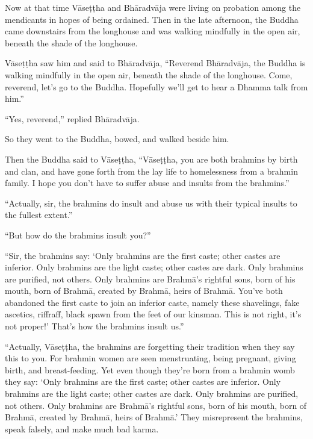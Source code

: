 \documentclass[12pt,openany]{book}%
\begin{document}
Now at that time \textsanskrit{Vāseṭṭha} and \textsanskrit{Bhāradvāja} were living on probation among the mendicants in hopes of being ordained. Then in the late afternoon, the Buddha came downstairs from the longhouse and was walking mindfully in the open air, beneath the shade of the longhouse. 

\textsanskrit{Vāseṭṭha} saw him and said to \textsanskrit{Bhāradvāja}, “Reverend \textsanskrit{Bhāradvāja}, the Buddha is walking mindfully in the open air, beneath the shade of the longhouse. Come, reverend, let’s go to the Buddha. Hopefully we’ll get to hear a Dhamma talk from him.” 

“Yes, reverend,” replied \textsanskrit{Bhāradvāja}. 

So they went to the Buddha, bowed, and walked beside him. 

Then the Buddha said to \textsanskrit{Vāseṭṭha}, “\textsanskrit{Vāseṭṭha}, you are both brahmins by birth and clan, and have gone forth from the lay life to homelessness from a brahmin family. I hope you don’t have to suffer abuse and insults from the brahmins.” 

“Actually, sir, the brahmins do insult and abuse us with their typical insults to the fullest extent.” 

“But how do the brahmins insult you?” 

“Sir, the brahmins say: ‘Only brahmins are the first caste; other castes are inferior. Only brahmins are the light caste; other castes are dark. Only brahmins are purified, not others. Only brahmins are \textsanskrit{Brahmā}’s rightful sons, born of his mouth, born of \textsanskrit{Brahmā}, created by \textsanskrit{Brahmā}, heirs of \textsanskrit{Brahmā}. You’ve both abandoned the first caste to join an inferior caste, namely these shavelings, fake ascetics, riffraff, black spawn from the feet of our kinsman. This is not right, it’s not proper!’ That’s how the brahmins insult us.” 

“Actually, \textsanskrit{Vāseṭṭha}, the brahmins are forgetting their tradition when they say this to you. For brahmin women are seen menstruating, being pregnant, giving birth, and breast-feeding. Yet even though they’re born from a brahmin womb they say: ‘Only brahmins are the first caste; other castes are inferior. Only brahmins are the light caste; other castes are dark. Only brahmins are purified, not others. Only brahmins are \textsanskrit{Brahmā}’s rightful sons, born of his mouth, born of \textsanskrit{Brahmā}, created by \textsanskrit{Brahmā}, heirs of \textsanskrit{Brahmā}.’ They misrepresent the brahmins, speak falsely, and make much bad karma. 
\end{document}
